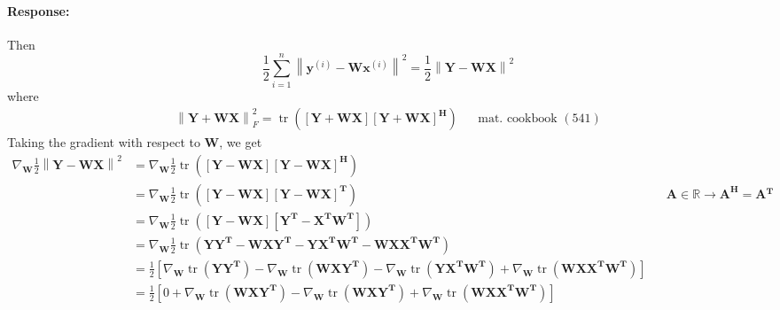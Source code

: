 \documentclass [11pt] {article}
\newcommand{\R}{\mathbb{R}}
\newcommand{\T}{\bf{T}}
\newcommand{\A}{\bf{A}}
\newcommand{\AT}{\bf{A$^{\T}$}}
\newcommand{\X}{\bf{X}}
\newcommand{\Y}{\bf{Y}}
\newcommand{\x}{\bf{x}}
\newcommand{\y}{\bf{y}}
\newcommand{\W}{\bf{W}}
\newenvironment{response}{\begin{responseframe}\vspace{-10pt}\paragraph{Response:}}{\end{responseframe}}
\DeclareMathOperator{\tr}{tr}
\renewcommand{\bf}[1]{\textbf{{#1}}}
\begin{document}
\begin{enumerate}
\begin{adjustwidth}{-8.4em}{-6em}
{\begin{response}
                    Then
                    \[\frac{1}{2} \sum^{n}_{i = 1} \left\| \y^{(i)} - \W \x^{(i)} \right\|^2 = \frac{1}{2} \left\| \Y - \W \X \right\|^2 \]
                    where
                    \begin{align*}
                        \left\| \Y + \W \X \right\|^{2}_{F} = \tr \left( \left[ \Y + \W \X \right] \left[ \Y + \W \X \right]^{\bf{H}} \right) && \text{mat. cookbook } (541)
                    \end{align*}
                    Taking the gradient with respect to $\W$, we get
                    \begin{align*}
                        \nabla_{\W} \frac{1}{2} \left\| \Y - \W \X \right\|^2
                                    &= \nabla_{\W} \frac{1}{2} \tr \left( \left[ \Y - \W \X \right] \left[ \Y - \W \X \right]^{\bf{H}} \right) \\
                                    &= \nabla_{\W} \frac{1}{2} \tr \left( \left[ \Y - \W \X \right] \left[ \Y - \W \X \right]^{\T} \right) && \A \in \R \to \A^{\bf{H}} = \AT\\
                                    &= \nabla_{\W} \frac{1}{2} \tr \left( \left[ \Y - \W \X \right] \left[ \Y^{\T} - \X^{\T} \W^{\T} \right] \right) \\
                                    &= \nabla_{\W} \frac{1}{2} \tr \left( \Y \Y^{\T} - \W \X \Y^{\T} - \Y \X^{\T} \W^{\T} - \W \X \X^{\T} \W^{\T} \right) \\
                                    &= 
                                    \frac{1}{2} 
                                    \left[
                                        \nabla_{\W} \tr \left( \Y \Y^{\T} \right) -
                                        \nabla_{\W} \tr \left( \W \X \Y^{\T} \right) -
                                        \nabla_{\W} \tr \left( \Y \X^{\T} \W^{\T} \right) +
                                        \nabla_{\W} \tr \left( \W \X \X^{\T} \W^{\T} \right)
                                    \right] \\
                                    &= 
                                    \frac{1}{2} 
                                    \left[
                                        0 + 
                                        \nabla_{\W} \tr \left( \W \X \Y^{\T} \right) -
                                        \nabla_{\W} \tr \left( \W \X \Y^{\T} \right) +
                                        \nabla_{\W} \tr \left( \W \X \X^{\T} \W^{\T} \right)
                                    \right] \\

\end{align*}
\end{response}}
\end{adjustwidth}
\end{enumerate}
\end{document}

